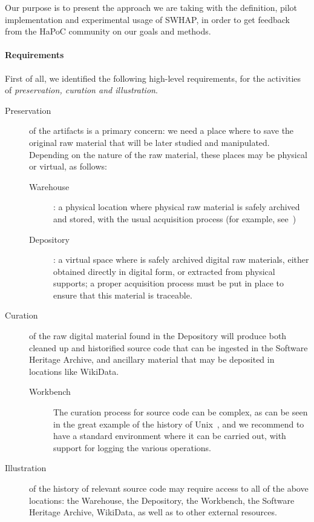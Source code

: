 \documentclass[a4paper]{article}
\begin{document}
\noindent
Our purpose is to present the approach we are taking with the definition, pilot implementation and experimental usage of SWHAP, in order to get feedback from the HaPoC community on our goals and methods. 

\paragraph{Requirements}
First of all, we identified the following high-level requirements, for the activities of \emph{preservation, curation and illustration}.



\begin{description}
	\item[Preservation] of the artifacts is a primary concern: we need a place where to save the original raw material that will be later studied and manipulated. Depending on the nature of the raw material, these places may be physical or virtual, as follows:
	\begin{description}
		\item[Warehouse]: a physical location where physical raw material is safely archived and stored, with the usual acquisition process (for example, see~\cite{Spectrum})
		\item[Depository]: a virtual space where is safely archived digital raw materials, either obtained directly in digital form, or extracted from physical supports; a proper acquisition process must be put in place to ensure that this material is traceable.
        \end{description}
      \item[Curation] of the raw digital material found in the Depository will produce both cleaned up and historified source code that can be ingested in the Software Heritage Archive, and ancillary material that may be deposited in locations like WikiData.
        \begin{description}
          \item[Workbench] The curation process for source code can be complex, as can be seen in the great example of the history of Unix~\cite{Spi16g}, and we recommend to have a standard environment where it can be carried out, with support for logging the various operations.
        \end{description}
      \item[Illustration] of the history of relevant source code may require access to all of the above locations: the Warehouse, the Depository, the Workbench, the Software Heritage Archive, WikiData, as well as to other external resources.
\end{description}
\end{document}
